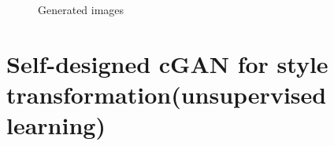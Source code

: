 \documentclass[11pt, a4paper]{article} %
\begin{document}
\begin{figure}[H]
    \hfill
    \caption{Generated images}
\end{figure}
\section{Self-designed cGAN for style transformation(unsupervised learning)}
\end{document}
